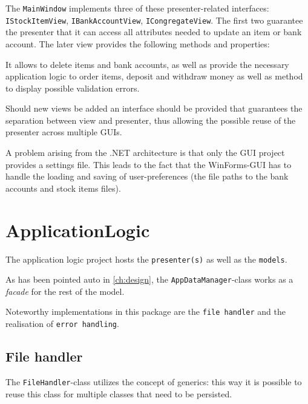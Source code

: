 

The \texttt{MainWindow} implements three of these presenter-related interfaces: \texttt{IStockItemView}, \texttt{IBankAccountView}, \texttt{ICongregateView}. The first two guarantee the presenter that it can access all attributes needed to update an item or bank account. The later view provides the following methods and properties:



It allows to delete items and bank accounts, as well as provide the necessary application logic to order items, deposit and withdraw money as well as method to display possible validation errors.

Should new views be added an interface should be provided that guarantees the separation between view and presenter, thus allowing the possible reuse of the presenter across multiple \ac{GUI}s.

A problem arising from the .NET architecture is that only the \ac{GUI} project provides a settings file. This leads to the fact that the WinForms-\ac{GUI} has to handle the loading and saving of user-preferences (the file paths to the bank accounts and stock items files).

\section{ApplicationLogic}
\label{sec:application_logic}

The application logic project hosts the \texttt{presenter(s)} as well as the \texttt{models}.

As has been pointed auto in \autoref{ch:design}, the \texttt{AppDataManager}-class works as a \textit{facade} for the rest of the model.

Noteworthy implementations in this package are the \texttt{file handler} and the realisation of \texttt{error handling}.

\subsection{File handler}
\label{subsec:filehandler}

The \texttt{FileHandler}-class utilizes the concept of generics: this way it is possible to reuse this class for multiple classes that need to be persisted.

